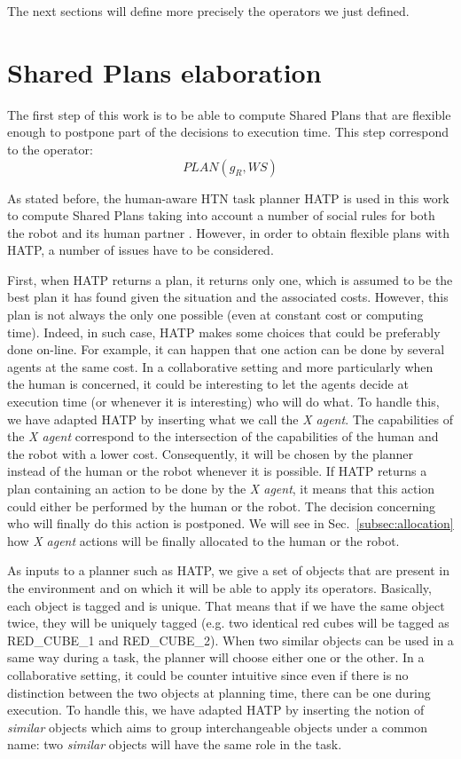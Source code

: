\documentclass[english,a4paper,11pt,twoside]{StyleThese}
\begin{document}
The next sections will define more precisely the operators we just defined.


\section{Shared Plans elaboration}

\label{sec:elaboration}

The first step of this work is to be able to compute Shared Plans that are flexible enough to postpone part of the decisions to execution time. This step correspond to the operator:
$$PLAN(g_R, WS)$$

As stated before, the human-aware HTN task planner HATP is used in this work to compute Shared Plans taking into account a number of social rules for both the robot and its human partner \cite{Lallement2014hatp}. However, in order to obtain flexible plans with HATP, a number of issues have to be considered.

First, when HATP returns a plan, it returns only one, which is assumed to be the best plan it has found given the situation and the associated costs. However, this plan is not always the only one possible (even at constant cost or computing time). Indeed, in such case, HATP makes some choices that could be preferably done on-line. For example, it can happen that one action can be done by several agents at the same cost. In a collaborative setting and more particularly when the human is concerned, it could be interesting to let the agents decide at execution time (or whenever it is interesting) who will do what. To handle this, we have adapted HATP by inserting what we call the \textit{X agent}. The capabilities of the \textit{X agent} correspond to the intersection of the capabilities of the human and the robot with a lower cost. Consequently, it will be chosen by the planner instead of the human or the robot whenever it is possible. If HATP returns a plan containing an action to be done by the \textit{X agent}, it means that this action could either be performed by the human or the robot. The decision concerning who will finally do this action is postponed. We will see in Sec.~\ref{subsec:allocation} how \textit{X agent} actions will be finally allocated to the human or the robot.

As inputs to a planner such as HATP, we give a set of objects that are present in the environment and on which it will be able to apply its operators. Basically, each object is tagged and is unique. That means that if we have the same object twice, they will be uniquely tagged (e.g. two identical red cubes will be tagged as RED\_CUBE\_1 and RED\_CUBE\_2). When two similar objects can be used in a same way during a task, the planner will choose either one or the other. In a collaborative setting, it could be counter intuitive since even if there is no distinction between the two objects at planning time, there can be one during execution. To handle this, we have adapted HATP by inserting the notion of \textit{similar} objects which aims to group interchangeable objects under a common name: two \textit{similar} objects will have the same role in the task. 
\end{document}
